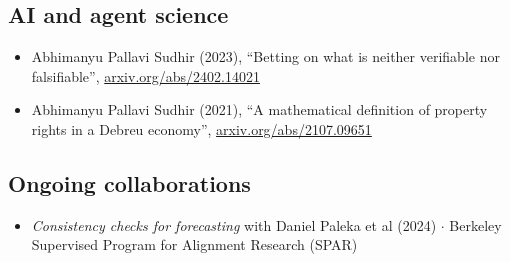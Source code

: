 \documentclass{article}
\begin{document}
\subsection*{AI and agent science}

\begin{itemize}

\item 
Abhimanyu Pallavi Sudhir (2023), ``Betting on what is neither verifiable nor falsifiable'', \href{https://arxiv.org/abs/2402.14021}{arxiv.org/abs/2402.14021}

\item
Abhimanyu Pallavi Sudhir (2021),
``A mathematical definition of property rights in a Debreu economy'', 
\href{https://arxiv.org/abs/2107.09651}{arxiv.org/abs/2107.09651}

\end{itemize}

\subsection*{Ongoing collaborations}

\begin{itemize}
    
    \item \emph{Consistency checks for forecasting} with Daniel Paleka et al (2024) $\cdot$ Berkeley Supervised Program for Alignment Research (SPAR)

\end{itemize}
\end{document}
